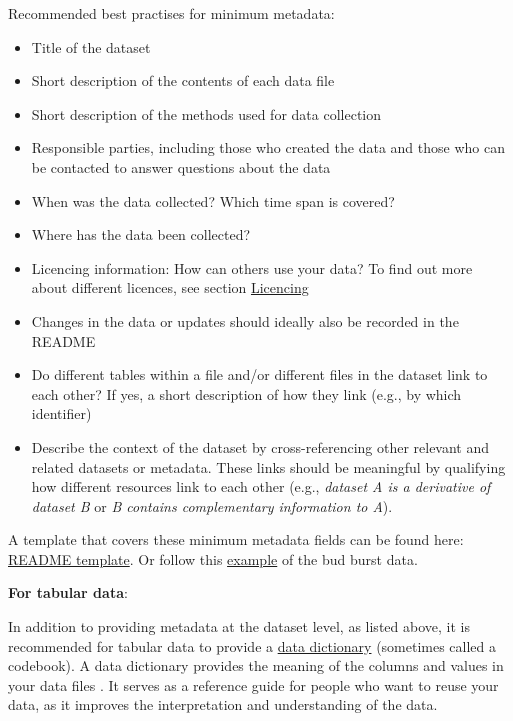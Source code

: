 \documentclass[
  oneside]{book}
\begin{document}
Recommended best practises for minimum metadata:

\begin{itemize}
\item
  Title of the dataset
\item
  Short description of the contents of each data file
\item
  Short description of the methods used for data collection
\item
  Responsible parties, including those who created the data and those who can be contacted to answer questions about the data
\item
  When was the data collected? Which time span is covered?
\item
  Where has the data been collected?
\item
  Licencing information: How can others use your data? To find out more about different licences, see section \hyperref[Licencing]{Licencing}
\item
  Changes in the data or updates should ideally also be recorded in the README
\item
  Do different tables within a file and/or different files in the dataset link to each other? If yes, a short description of how they link (e.g., by which identifier)
\item
  Describe the context of the dataset by cross-referencing other relevant and related datasets or metadata. These links should be meaningful by qualifying how different resources link to each other (e.g., \emph{dataset A is a derivative of dataset B} or \emph{B contains complementary information to A}).
\end{itemize}

\begin{infobox}

A template that covers these minimum metadata fields can be found here: \href{https://github.com/LTER-LIFE/FDFDT/blob/main/readme-templates/README-template.md}{README template}. Or follow this \href{https://github.com/LTER-LIFE/FDFDT/blob/main/readme-templates/README-example-budburst.md}{example} of the bud burst data.

\end{infobox}

\textbf{For tabular data}:

In addition to providing metadata at the dataset level, as listed above, it is recommended for tabular data to provide a \hyperref[data-dictionary]{data dictionary} (sometimes called a codebook). A data dictionary provides the meaning of the columns and values in your data files \autocite{Buchanan_2021}. It serves as a reference guide for people who want to reuse your data, as it improves the interpretation and understanding of the data.
\end{document}
